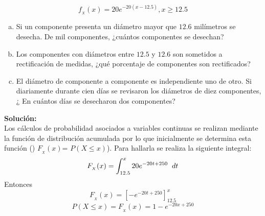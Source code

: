 \documentclass[base=hide,12pt]{elegantbook}
\begin{document}
$$f_{_X}(x)=20e^{-20(x-12.5)}, x \geq 12.5$$
	
\begin{enumerate}[(a)]
	\item Si un componente presenta un  diámetro mayor que $12.6$ milímetros se desecha. De mil componentes, ¿cuántos componentes se desechan?
	\item Los componentes con diámetros entre $12.5$ y $12.6$ son sometidos a rectificación de medidas, ¿qué porcentaje de componentes son rectificados?
	\item El diámetro de componente a componente es independiente uno de otro. Si diariamente durante cien días se revisaron los diámetros de diez componentes, ¿ En cuántos días se desecharon dos componentes?
\end{enumerate}

\textcolor{col3}{\bf Solución:}\\
Los cálculos de  probabilidad asociados a variables continuas se realizan  mediante  la  función  de distribución acumulada por lo que inicialmente se determina esta función () $F_{_X}(x)$= $P(X \leq x)$). Para hallarla se realiza la siguiente integral:\\
%	
$$F_{_X}(x)=\int_{12.5}^{x}20e^{-20t + 250} \hspace{.2cm}dt$$
%	
Entonces
%	
$$F_{_X}(x) =  \left[ -e^{-20t + 250} \right]_{12.5}^{x}$$
%	
$$P(X \leq x)= F_{_X}(x) = 1 - e^{-20x + 250}$$ 
\end{document}

